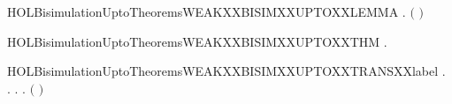 \begin{SaveVerbatim}{HOLBisimulationUptoTheoremsWEAKXXBISIMXXUPTOXXLEMMA}
\HOLTokenTurnstile{} \HOLSymConst{\HOLTokenForall{}}.
         \HOLSymConst{\HOLTokenImp{}}
        \ensuremath{(}    \ensuremath{)}
\end{SaveVerbatim}
\newcommand{\HOLBisimulationUptoTheoremsWEAKXXBISIMXXUPTOXXLEMMA}{\UseVerbatim{HOLBisimulationUptoTheoremsWEAKXXBISIMXXUPTOXXLEMMA}}
\begin{SaveVerbatim}{HOLBisimulationUptoTheoremsWEAKXXBISIMXXUPTOXXTHM}
\HOLTokenTurnstile{} \HOLSymConst{\HOLTokenForall{}}.   \HOLSymConst{\HOLTokenImp{}}   
\end{SaveVerbatim}
\newcommand{\HOLBisimulationUptoTheoremsWEAKXXBISIMXXUPTOXXTHM}{\UseVerbatim{HOLBisimulationUptoTheoremsWEAKXXBISIMXXUPTOXXTHM}}
\begin{SaveVerbatim}{HOLBisimulationUptoTheoremsWEAKXXBISIMXXUPTOXXTRANSXXlabel}
\HOLTokenTurnstile{} \HOLSymConst{\HOLTokenForall{}}.
         \HOLSymConst{\HOLTokenImp{}}
       \HOLSymConst{\HOLTokenForall{}} .
              \HOLSymConst{\HOLTokenImp{}}
           \HOLSymConst{\HOLTokenForall{}} .
                \HOLTokenTransBegin{} \HOLTokenTransEnd {} \HOLSymConst{\HOLTokenImp{}}
               \HOLSymConst{\HOLTokenExists{}}.
                    \HOLTokenWeakTransBegin{} \HOLTokenWeakTransEnd {} \HOLSymConst{\HOLTokenConj{}}
                   \ensuremath{(}    \ensuremath{)}  
\end{SaveVerbatim}
\newcommand{\HOLBisimulationUptoTheoremsWEAKXXBISIMXXUPTOXXTRANSXXlabel}{\UseVerbatim{HOLBisimulationUptoTheoremsWEAKXXBISIMXXUPTOXXTRANSXXlabel}}
